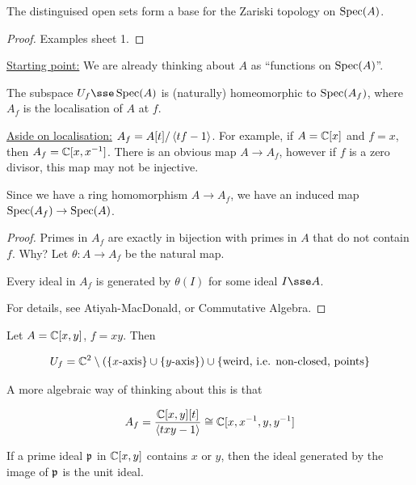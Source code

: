 \documentclass{article}
\newcommand{\set}[1]{\left\{#1\right\}}
\begin{document}
\begin{lemma}
    The distinguised open sets form a base for the Zariski topology on \(\operatorname{Spec}(A)\).
\end{lemma}

\begin{proof}
    Examples sheet 1.
\end{proof}

\underline{Starting point:} We are already thinking about \(A\) as ``functions on \(\operatorname{Spec}(A)\)''.

\begin{lemma}
    The subspace \(U_f \sse \Spec(A)\) is (naturally) homeomorphic to \(\operatorname{Spec}(A_f)\), where \(A_f\) is the localisation of \(A\) at \(f\).
\end{lemma}

\underline{Aside on localisation:} \(A_f = A[t]/\left\langle tf - 1 \right\rangle\). For example, if \(A = \mathbb{C}[x]\) and \(f = x\), then \(A_f = \mathbb{C}[x, x^{-1}]\). There is an obvious map \(A \to A_f\), however if \(f\) is a zero divisor, this map may not be injective.

Since we have a ring homomorphism \(A \to A_f\), we have an induced map \(\operatorname{Spec}(A_f) \to \operatorname{Spec}(A)\).

\begin{proof}
    Primes in \(A_f\) are exactly in bijection with primes in \(A\) that do not contain \(f\). Why? Let \(\theta : A \to A_f\) be the natural map.

    \begin{claim}
        Every ideal in \(A_f\) is generated by \(\theta(I)\) for some ideal \(I \sse A\).
    \end{claim}

    For details, see Atiyah-MacDonald, or Commutative Algebra.
\end{proof}

\begin{example}
    Let \(A = \mathbb{C}[x, y]\), \(f = xy\). Then 

    \[U_f = \C^2 \setminus \left(\set{x\text{-axis}} \cup \set{y\text{-axis}}\right) \cup \set{\text{weird, i.e. non-closed, points}}\]

    A more algebraic way of thinking about this is that

    \[A_f = \frac{\mathbb{C}[x, y][t]}{\left\langle txy - 1 \right\rangle} \cong \mathbb{C}[x, x^{-1}, y, y^{-1}]\]

    If a prime ideal \(\mathfrak{p}\) in \(\mathbb{C}[x, y]\) contains \(x\) or \(y\), then the ideal generated by the image of \(\mathfrak{p}\) is the unit ideal. 
\end{example}
\end{document}
